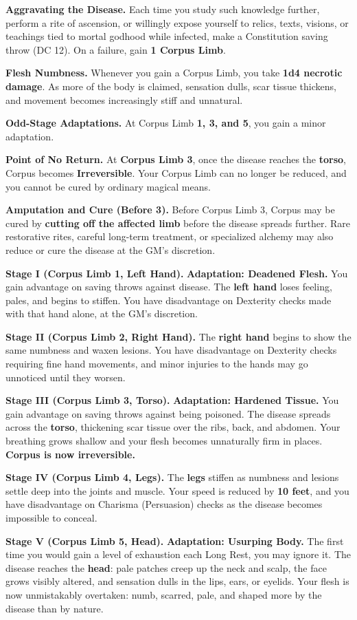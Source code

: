 \textbf{Aggravating the Disease.} Each time you study such knowledge further, perform a rite of ascension, or willingly expose yourself to relics, texts, visions, or teachings tied to mortal godhood while infected, make a Constitution saving throw (DC 12). On a failure, gain \textbf{1 Corpus Limb}.

\textbf{Flesh Numbness.} Whenever you gain a Corpus Limb, you take \textbf{1d4 necrotic damage}. As more of the body is claimed, sensation dulls, scar tissue thickens, and movement becomes increasingly stiff and unnatural.

\textbf{Odd-Stage Adaptations.} At Corpus Limb \textbf{1, 3, and 5}, you gain a minor adaptation.

\textbf{Point of No Return.} At \textbf{Corpus Limb 3}, once the disease reaches the \textbf{torso}, Corpus becomes \textbf{Irreversible}. Your Corpus Limb can no longer be reduced, and you cannot be cured by ordinary magical means.

\textbf{Amputation and Cure (Before 3).} Before Corpus Limb 3, Corpus may be cured by \textbf{cutting off the affected limb} before the disease spreads further. Rare restorative rites, careful long-term treatment, or specialized alchemy may also reduce or cure the disease at the GM's discretion.

\medskip

\textbf{Stage I (Corpus Limb 1, Left Hand).} \textbf{Adaptation: Deadened Flesh.} You gain advantage on saving throws against disease.
The \textbf{left hand} loses feeling, pales, and begins to stiffen. You have disadvantage on Dexterity checks made with that hand alone, at the GM's discretion.

\textbf{Stage II (Corpus Limb 2, Right Hand).} The \textbf{right hand} begins to show the same numbness and waxen lesions. You have disadvantage on Dexterity checks requiring fine hand movements, and minor injuries to the hands may go unnoticed until they worsen.

\textbf{Stage III (Corpus Limb 3, Torso).} \textbf{Adaptation: Hardened Tissue.} You gain advantage on saving throws against being poisoned.
The disease spreads across the \textbf{torso}, thickening scar tissue over the ribs, back, and abdomen. Your breathing grows shallow and your flesh becomes unnaturally firm in places. \textbf{Corpus is now irreversible.}

\textbf{Stage IV (Corpus Limb 4, Legs).} The \textbf{legs} stiffen as numbness and lesions settle deep into the joints and muscle. Your speed is reduced by \textbf{10 feet}, and you have disadvantage on Charisma (Persuasion) checks as the disease becomes impossible to conceal.

\textbf{Stage V (Corpus Limb 5, Head).} \textbf{Adaptation: Usurping Body.} The first time you would gain a level of exhaustion each Long Rest, you may ignore it.
The disease reaches the \textbf{head}: pale patches creep up the neck and scalp, the face grows visibly altered, and sensation dulls in the lips, ears, or eyelids. Your flesh is now unmistakably overtaken: numb, scarred, pale, and shaped more by the disease than by nature.
